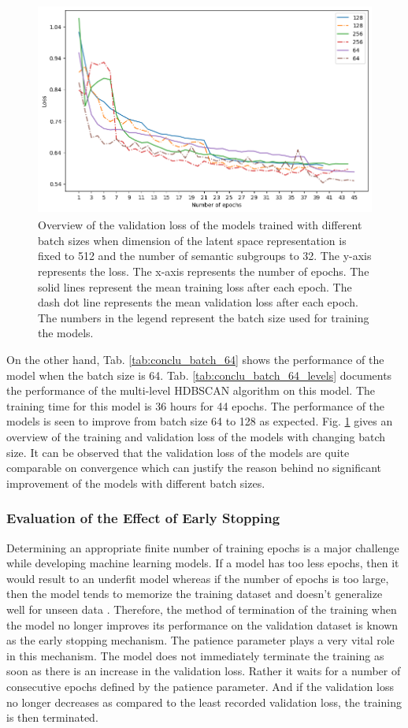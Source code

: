 \begin{figure}[H]
  \centering
  \includegraphics[width=400pt,height=200pt]{pictures/loss_batch.png}
  \caption{Overview of the validation loss of the models trained with different batch sizes when dimension of the latent space representation is fixed to 512 and the number of semantic subgroups to 32. The y-axis represents the loss. The x-axis represents the number of epochs. The solid lines represent the mean training loss after each epoch. The dash dot line represents the mean validation loss after each epoch. The numbers in the legend represent the batch size used for training the models. }
  \label{fig:loss_batch}
\end{figure} 

On the other hand, Tab. \ref{tab:conclu_batch_64} shows the performance of the model when the batch size is 64. Tab. \ref{tab:conclu_batch_64_levels} documents the performance of the multi-level \ac{HDBSCAN} algorithm on this model. The training time for this model is 36 hours for 44 epochs. The performance of the models is seen to improve from batch size 64 to 128 as expected. Fig. \ref{fig:loss_batch} gives an overview of the training and validation loss of the models with changing batch size. It can be observed that the validation loss of the models are quite comparable on convergence which can justify the reason behind no significant improvement of the models with different batch sizes. 

\subsubsection{Evaluation of the Effect of Early Stopping}
Determining an appropriate finite number of training epochs is a major challenge while developing machine learning models. If a model has too less epochs, then it would result to an underfit model whereas if the number of epochs is too large, then the model tends to memorize the training dataset and doesn't generalize well for unseen data \cite{Goodfellow-et-al-2016}. Therefore, the method of termination of the training when the model no longer improves its performance on the validation dataset is known as the early stopping mechanism. The patience parameter plays a very vital role in this mechanism. The model does not immediately terminate the training as soon as there is an increase in the validation loss. Rather it waits for a number of consecutive epochs defined by the patience parameter. And if the validation loss no longer decreases as compared to the least recorded validation loss, the training is then terminated.

